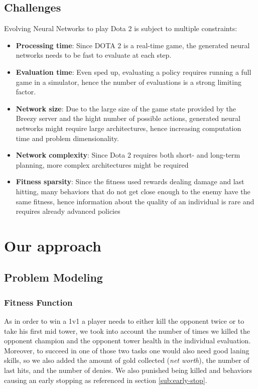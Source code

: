 \subsection{Challenges}
\begin{minipage}{\linewidth}
Evolving Neural Networks to play Dota 2 is subject to multiple constraints:
\begin{itemize}
    \item \textbf{Processing time}: Since DOTA 2 is a real-time game, the generated neural networks needs to be fast to evaluate at each step.
    \item \textbf{Evaluation time}: Even sped up, evaluating a policy requires running a full game in a simulator, hence the number of evaluations is a strong limiting factor.
    \item \textbf{Network size}: Due to the large size of the game state provided by the Breezy server and the hight number of possible actions, generated neural networks might require large architectures, hence increasing computation time and problem dimensionality.
    \item\textbf{Network complexity}: Since Dota 2 requires both short- and long-term planning, more complex architectures might be required 
    \item \textbf{Fitness sparsity}: Since the fitness used rewards dealing damage and last hitting, many behaviors that do not get close enough to the enemy have the same fitness, hence information about the quality of an individual is rare and requires already advanced policies
\end{itemize}
\end{minipage}

\section{Our approach}

\subsection{Problem Modeling}
\label{sec:representation choice}

\subsubsection{Fitness Function}
As in order to win a 1v1 a player needs to either kill the opponent twice or to take his first mid tower, we took into account the number of times we killed the opponent champion and the opponent tower health in the individual evaluation. Moreover, to succeed in one of those two tasks one would also need good laning skills, so we also added the amount of gold collected (\textit{net worth}), the number of last hits, and the number of denies. We also punished being killed and behaviors causing an early stopping as referenced in section \ref{sub:early-stop}.

